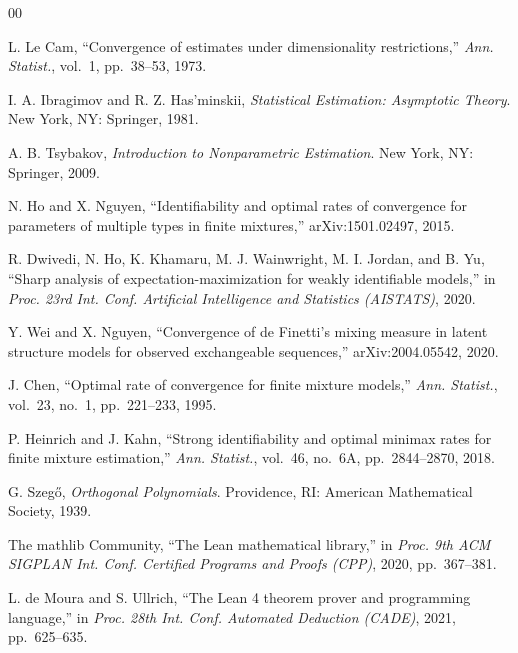 \begin{thebibliography}{00}

 L. Le Cam, ``Convergence of estimates under dimensionality
restrictions,'' \emph{Ann. Statist.}, vol.~1, pp.~38--53, 1973.

 I. A. Ibragimov and R. Z. Has'minskii, \emph{Statistical Estimation:
Asymptotic Theory}. New York, NY: Springer, 1981.

 A. B. Tsybakov, \emph{Introduction to Nonparametric Estimation}.
New York, NY: Springer, 2009.

 N. Ho and X. Nguyen, ``Identifiability and optimal rates of convergence
for parameters of multiple types in finite mixtures,'' arXiv:1501.02497, 2015.

 R. Dwivedi, N. Ho, K. Khamaru, M. J. Wainwright, M. I. Jordan, and
B. Yu, ``Sharp analysis of expectation-maximization for weakly identifiable models,'' in
\emph{Proc. 23rd Int. Conf. Artificial Intelligence and Statistics (AISTATS)}, 2020.

 Y. Wei and X. Nguyen, ``Convergence of de Finetti's mixing measure in
latent structure models for observed exchangeable sequences,'' arXiv:2004.05542, 2020.

 J. Chen, ``Optimal rate of convergence for finite mixture models,''
\emph{Ann. Statist.}, vol.~23, no.~1, pp.~221--233, 1995.

 P. Heinrich and J. Kahn, ``Strong identifiability and optimal minimax
rates for finite mixture estimation,'' \emph{Ann. Statist.}, vol.~46, no.~6A,
pp.~2844--2870, 2018.

 G. Szeg\H{o}, \emph{Orthogonal Polynomials}. Providence, RI: American
Mathematical Society, 1939.

 The mathlib Community, ``The Lean mathematical library,'' in
\emph{Proc. 9th ACM SIGPLAN Int. Conf. Certified Programs and Proofs (CPP)}, 2020,
pp.~367--381.

 L. de Moura and S. Ullrich, ``The Lean 4 theorem prover and
programming language,'' in \emph{Proc. 28th Int. Conf. Automated Deduction (CADE)}, 2021,
pp.~625--635.

\end{thebibliography}




